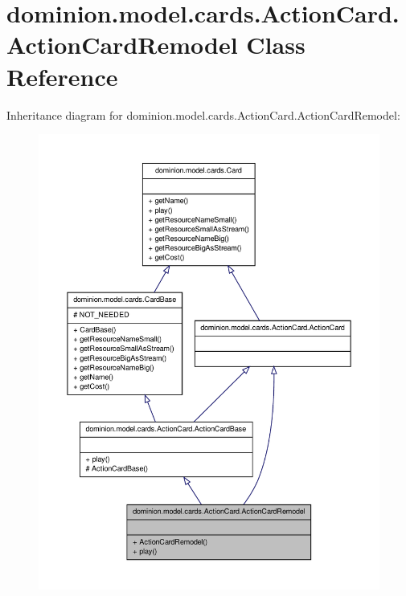 \hypertarget{classdominion_1_1model_1_1cards_1_1ActionCard_1_1ActionCardRemodel}{\section{dominion.\-model.\-cards.\-Action\-Card.\-Action\-Card\-Remodel \-Class \-Reference}
\label{classdominion_1_1model_1_1cards_1_1ActionCard_1_1ActionCardRemodel}
}


\-Inheritance diagram for dominion.\-model.\-cards.\-Action\-Card.\-Action\-Card\-Remodel\-:
\nopagebreak
\begin{figure}[H]
\begin{center}
\leavevmode
\includegraphics[width=350pt]{classdominion_1_1model_1_1cards_1_1ActionCard_1_1ActionCardRemodel__inherit__graph}
\end{center}
\end{figure}


